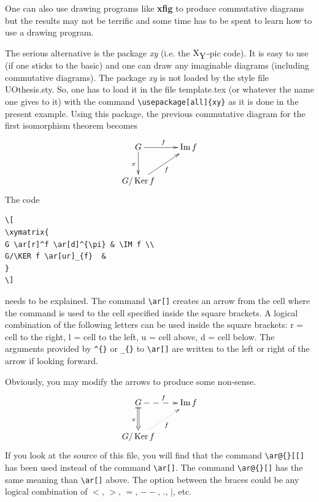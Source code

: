 One can also use drawing programs like {\bfseries xfig} to produce
commutative diagrams but the results may not be terrific and some time has to
be spent to learn how to use a drawing program.

The serious alternative is the package {\em xy} (i.e. the
$\text{X}_\text{\normalsize Y}$-pic code).  It is easy to use (if one sticks
to the basic) and one can draw any imaginable diagrams (including commutative
diagrams).  The package {\em xy} is not loaded by the style file
UOthesis.sty.  So, one has to load it in the file template.tex (or whatever
the name one gives to it) with the command \verb=\usepackage[all]{xy}= as it
is done in the present example. Using this package, the previous commutative
diagram for the first isomorphism theorem becomes
\[
\xymatrix{
G \ar[r]^f \ar[d]_{\pi} & \IM f \\
G/\KER f \ar[ur]_{f} &
}
\]
The code
\begin{verbatim}
\[
\xymatrix{
G \ar[r]^f \ar[d]^{\pi} & \IM f \\
G/\KER f \ar[ur]_{f}  &
}
\]
\end{verbatim}
needs to be explained.  The command \verb=\ar[]= creates an arrow from the
cell where the command is used to the cell specified inside the square
brackets.  A logical combination of the following letters can be used inside
the square brackets: r = cell to the right, l = cell to the left, u = cell
above, d = cell below.  The arguments provided by \verb=^{}= or \verb=_{}= to
\verb=\ar[]= are written to the left or right of the arrow if looking
forward.

Obviously, you may modify the arrows to produce some non-sense.
\[
\xymatrix{
G \ar@{-->}[r]^f \ar@{|=>}[d]_{\pi} & \IM f \\
G/\KER f \ar@{.>}[ur]_{f} &
}
\]
If you look at the source of this file, you will find that the command
\verb=\ar@{}[[]= has been used instead of the command \verb=\ar[]=.
The command \verb=\ar@{}[]= has the same meaning than \verb=\ar[]= above.
The option between the braces could be any logical combination of $<$, $>$,
$=$, $--$, $.$, $|$, etc.  

